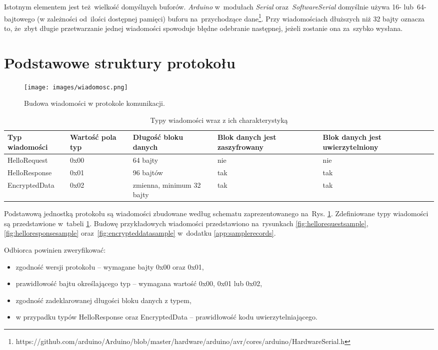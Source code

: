 Istotnym elementem jest też wielkość domyślnych buforów. \emph{Arduino} w~modułach \emph{Serial} oraz~\emph{SoftwareSerial} domyślnie używa 16- lub~64-bajtowego (w zależności od~ilości dostępnej pamięci) buforu na~przychodzące dane\footnote{https://github.com/arduino/Arduino/blob/master/hardware/arduino/avr/cores/arduino/HardwareSerial.h}. Przy wiadomościach dłuższych niż 32 bajty oznacza to, że~zbyt długie przetwarzanie jednej wiadomości spowoduje błędne odebranie następnej, jeżeli zostanie ona za~szybko wysłana.

\section{Podstawowe struktury protokołu}
\label{sec:proto}

\begin{figure}[ht]
\centering
\texttt{[image: images/wiadomosc.png]}
\caption{Budowa wiadomości w protokole komunikacji.}
\label{fig:message-def}
\end{figure}

\begin{table}[t]
\centering
\caption{Typy wiadomości wraz z ich charakterystyką}
\begin{tabular}{|p{2.3cm}|p{1.4cm}|l|p{2.9cm}|p{3.1cm}|}
    \hline
    \textbf{Typ \mbox{wiadomości}}  &
    \textbf{Wartość pola typ}  &
    \textbf{Długość bloku danych}  &
    \textbf{Blok danych jest zaszyfrowany}  &
    \textbf{Blok danych jest uwierzytelniony}\\
    \hline
    HelloRequest & 0x00 & 64 bajty & nie & nie\\
    \hline
    HelloResponse & 0x01 & 96 bajtów & tak & tak\\
    \hline
    EncryptedData & 0x02 & zmienna, minimum 32 bajty & tak & tak\\
    \hline
\end{tabular}
\label{tab:recordtypes}
\end{table}

Podstawową jednostką protokołu są wiadomości zbudowane według schematu zaprezentowanego na~Rys. \ref{fig:message-def}. Zdefiniowane typy wiadomości są przedstawione w~tabeli \ref{tab:recordtypes}. Budowę przykładowych wiadomości przedstawiono na~rysunkach \ref{fig:hellorequestsample}, \ref{fig:helloresponsesample} oraz~\ref{fig:encrypteddatasample} w~dodatku \ref{app:samplerecords}.

Odbiorca powinien zweryfikować:

\begin{itemize}
\item zgodność wersji protokołu -- wymagane bajty 0x00 oraz 0x01,
\item prawidłowość bajtu określającego typ -- wymagana wartość 0x00, 0x01 lub 0x02,
\item zgodność zadeklarowanej długości bloku danych z typem,
\item w przypadku typów HelloResponse oraz EncryptedData -- prawidłowość kodu uwierzytelniającego.
\end{itemize}

